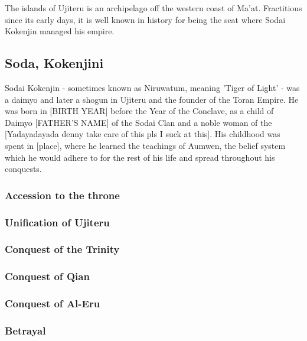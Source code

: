 	The islands of Ujiteru is an archipelago off the western coast of Ma'at. Fractitious since its early days, it is well known in history for being the seat where Sodai Kokenjin managed his empire.
	\subsection{Soda, Kokenjini}
			 
		Sodai Kokenjin - sometimes known as Niruwatum, meaning 'Tiger of Light' - was a daimyo and later a shogun in Ujiteru and the founder of the Toran Empire. He was born in [BIRTH YEAR] before the Year of the Conclave, as a child of Daimyo [FATHER'S NAME] of the Sodai Clan and a noble woman of the [Yadayadayada denny take care of this pls I suck at this]. His childhood was spent in [place], where he learned the teachings of Aumwen, the belief system which he would adhere to for the rest of his life and spread throughout his conquests.\par
		\subsubsection{Accession to the throne}
		\subsubsection{Unification of Ujiteru}
		\subsubsection{Conquest of the Trinity}
		\subsubsection{Conquest of Qian}
		\subsubsection{Conquest of Al-Eru}
		\subsubsection{Betrayal}
